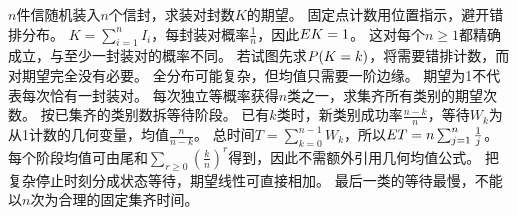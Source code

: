 {$n$件信随机装入$n$个信封，求装对封数$K$的期望。}
{固定点计数用位置指示，避开错排分布。}
{$K=\sum_{i=1}^nI_i$，每封装对概率$\frac{1}{n}$，因此$E K=1$。
这对每个$n\ge1$都精确成立，与至少一封装对的概率不同。
若试图先求$P(K=k)$，将需要错排计数，而对期望完全没有必要。}
{全分布可能复杂，但均值只需要一阶边缘。}
{期望为1不代表每次恰有一封装对。}
{每次独立等概率获得$n$类之一，求集齐所有类别的期望次数。}
{按已集齐的类别数拆等待阶段。}
{已有$k$类时，新类别成功率$\frac{n-k}{n}$，等待$W_k$为从1计数的几何变量，均值$\frac{n}{n-k}$。
总时间$T=\sum_{k=0}^{n-1}W_k$，所以$E T=n\sum_{j=1}^n\frac{1}{j}$。
每个阶段均值可由尾和$\sum_{r\ge0}(\frac{k}{n})^r$得到，因此不需额外引用几何均值公式。}
{把复杂停止时刻分成状态等待，期望线性可直接相加。}
{最后一类的等待最慢，不能以$n$次为合理的固定集齐时间。}


